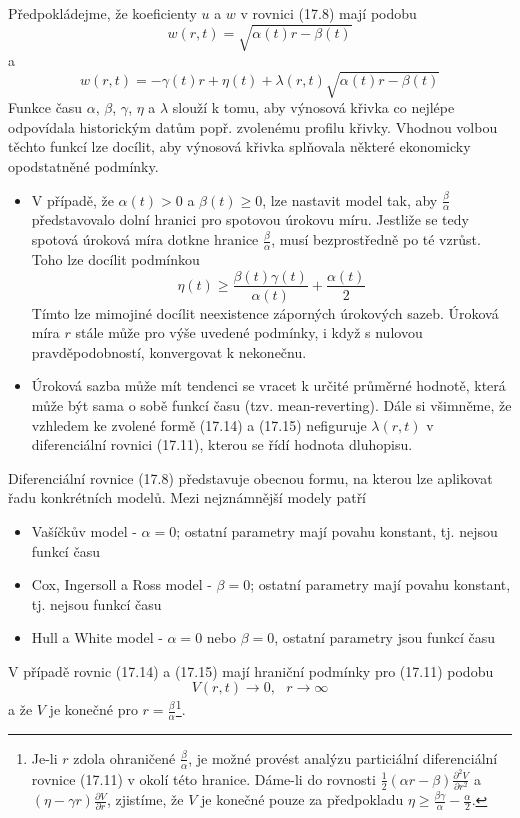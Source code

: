 \documentclass[a4paper]{book}
\begin{document}
Předpokládejme, že koeficienty $u$ a $w$ v rovnici (17.8) mají podobu
\begin{equation}
w(r,t) = \sqrt{\alpha(t)r - \beta(t)}
\end{equation}
a
\begin{equation}
w(r,t) = - \gamma(t)r + \eta(t) + \lambda(r,t)\sqrt{\alpha(t)r - \beta(t)}
\end{equation}
Funkce času $\alpha$, $\beta$, $\gamma$, $\eta$ a $\lambda$ slouží k tomu, aby výnosová křivka co nejlépe odpovídala historickým datům popř. zvolenému profilu křivky. Vhodnou volbou těchto funkcí lze docílit, aby výnosová křivka splňovala některé ekonomicky opodstatněné podmínky.
\begin{itemize}
\item V případě, že $\alpha(t) > 0$ a $\beta(t) \ge 0$, lze nastavit model tak, aby $\frac{\beta}{\alpha}$ představovalo dolní hranici pro spotovou úrokovu míru. Jestliže se tedy spotová úroková míra dotkne hranice $\frac{\beta}{\alpha}$, musí bezprostředně po té vzrůst. Toho lze docílit podmínkou
\begin{equation*}
\eta(t) \ge \frac{\beta(t) \gamma(t)}{\alpha(t)} + \frac{\alpha(t)}{2}
\end{equation*}
Tímto lze mimojiné docílit neexistence záporných úrokových sazeb. Úroková míra $r$ stále může pro výše uvedené podmínky, i když s nulovou pravděpodobností, konvergovat k nekonečnu.
\item Úroková sazba může mít tendenci se vracet k určité průměrné hodnotě, která může být sama o sobě funkcí času (tzv. mean-reverting).
Dále si všimněme, že vzhledem ke zvolené formě (17.14) a (17.15) nefiguruje $\lambda(r,t)$ v diferenciální rovnici (17.11), kterou se řídí hodnota dluhopisu.
\end{itemize}

Diferenciální rovnice (17.8) představuje obecnou formu, na kterou lze aplikovat řadu konkrétních modelů. Mezi nejznámnější modely patří
\begin{itemize}
\item Vašíčkův model - $\alpha = 0$; ostatní parametry mají povahu konstant, tj. nejsou funkcí času
\item Cox, Ingersoll a Ross model - $\beta = 0$; ostatní parametry mají povahu konstant, tj. nejsou funkcí času
\item Hull a White model - $\alpha = 0$ nebo $\beta = 0$, ostatní parametry jsou funkcí času
\end{itemize}

V případě rovnic (17.14) a (17.15) mají hraniční podmínky pro (17.11) podobu
\begin{equation*}
V(r,t) \rightarrow 0, ~~~ r \rightarrow \infty
\end{equation*}
a že $V$ je konečné pro $r = \frac{\beta}{\alpha}$\footnote{Je-li $r$ zdola ohraničené $\frac{\beta}{\alpha}$, je možné provést analýzu particiální diferenciální rovnice (17.11) v okolí této hranice. Dáme-li do rovnosti $\frac{1}{2}(\alpha r - \beta) \frac{\partial^2 V}{\partial r^2}$ a $(\eta - \gamma r)\frac{\partial V}{\partial r}$, zjistíme, že $V$ je konečné pouze za předpokladu $\eta \ge \frac{\beta \gamma}{\alpha} - \frac{\alpha}{2}$.}.
\end{document}
